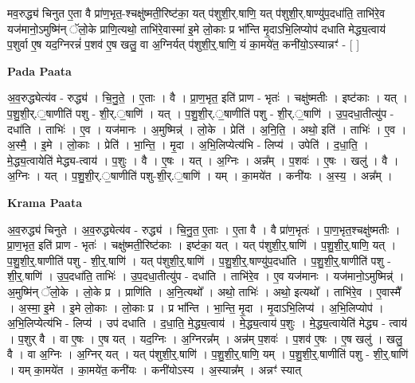 \documentclass[17pt]{extarticle}
\begin{document}
मव॒रुद्ध्य॑ चिनुत ए॒ता वै प्रा॑ण॒भृत॒-श्चक्षु॑ष्मती॒रिष्ट॑का॒ यत् प॑शुशी॒र्.षाणि॒ यत् प॑शुशी॒र्.षाण्यु॑प॒दधा॑ति॒ ताभि॑रे॒व यज॑मानो॒ऽमुष्मि॑न् ॅलो॒के प्राणि॒त्यथो॒ ताभि॑रे॒वास्मा॑ इ॒मे लो॒काः प्र भा᳚न्ति मृ॒दाऽभि॒लिप्योप॑ दधाति मेद्ध्य॒त्वाय॑ प॒शुर्वा ए॒ष यद॒ग्निरन्नं॑ प॒शव॑ ए॒ष खलु॒ वा अ॒ग्निर्यत् प॑शुशी॒र्॒.षाणि॒ यं का॒मये॑त॒ कनी॑यो॒ऽस्यान्नꣳ॑ - [  ] \newline

\textbf{Pada Paata} \newline

अ॒व॒रुद्ध्येत्य॑व - रुद्ध्य॑ । चि॒नु॒ते॒ । ए॒ताः । वै । प्रा॒ण॒भृत॒ इति॑ प्राण - भृतः॑ । चक्षु॑ष्मतीः । इष्ट॑काः । यत् । प॒शु॒शी॒र्.॒षाणीति॑ पशु - शी॒र्.॒षाणि॑ । यत् । प॒शु॒शी॒र्.॒षाणीति॑ पशु - शी॒र्.॒षाणि॑ । उ॒प॒दधा॒तीत्यु॑प - दधा॑ति । ताभिः॑ । ए॒व । यज॑मानः । अ॒मुष्मिन्न्॑ । लो॒के । प्रेति॑ । अ॒नि॒ति॒ । अथो॒ इति॑ । ताभिः॑ । ए॒व । अ॒स्मै॒ । इ॒मे । लो॒काः । प्रेति॑ । भा॒न्ति॒ । मृ॒दा । अ॒भि॒लिप्येत्य॑भि - लिप्य॑ । उपेति॑ । द॒धा॒ति॒ । मे॒द्ध्य॒त्वायेति॑ मेद्ध्य-त्वाय॑ । प॒शुः । वै । ए॒षः । यत् । अ॒ग्निः । अन्न᳚म् । प॒शवः॑ । ए॒षः । खलु॑ । वै । अ॒ग्निः । यत् । प॒शु॒शी॒र्.॒षाणीति॑ पशु-शी॒र्.॒षाणि॑ । यम् । का॒मये॑त । कनी॑यः । अ॒स्य॒ । अन्न᳚म् ।  \newline


\textbf{Krama Paata} \newline

अ॒व॒रुद्ध्य॑ चिनुते । अ॒व॒रुद्ध्येत्य॑व - रुद्ध्य॑ । चि॒नु॒त॒ ए॒ताः । ए॒ता वै । वै प्रा॑ण॒भृतः॑ । पा॒ण॒भृत॒श्चक्षु॑ष्मतीः । प्रा॒ण॒भृत॒ इति॑ प्राण - भृतः॑ । चक्षु॑ष्मती॒रिष्ट॑काः । इष्ट॑का॒ यत् । यत् प॑शुशी॒र्॒.षाणि॑ । प॒शु॒शी॒र्॒.षाणि॒ यत् । प॒शु॒शी॒र्॒.षाणीति॑ पशु - शी॒र्॒.षाणि॑ । यत् प॑शुशी॒र्॒.षाणि॑ । प॒शु॒शी॒र्॒.षाण्यु॑प॒दधा॑ति । प॒शु॒शी॒र्॒.षाणीति॑ पशु - शी॒र्॒.षाणि॑ । उ॒प॒दधा॑ति॒ ताभिः॑ । उ॒प॒दधा॒तीत्यु॑प - दधा॑ति । ताभि॑रे॒व । ए॒व यज॑मानः । यज॑मानो॒ऽमुष्मिन्न्॑ । अ॒मुष्मि॑न् ॅलो॒के । लो॒के प्र । प्राणि॑ति । अ॒नि॒त्यथो᳚ । अथो॒ ताभिः॑ । अथो॒ इत्यथो᳚ । ताभि॑रे॒व । ए॒वास्मै᳚ । अ॒स्मा॒ इ॒मे । इ॒मे लो॒काः । लो॒काः प्र । प्र भा᳚न्ति । भा॒न्ति॒ मृ॒दा । मृ॒दाऽभि॒लिप्य॑ । अ॒भि॒लिप्योप॑ । अ॒भि॒लिप्येत्य॑भि - लिप्य॑ । उप॑ दधाति । द॒धा॒ति॒ मे॒द्ध्य॒त्वाय॑ । मे॒द्ध्य॒त्वाय॑ प॒शुः । मे॒द्ध्य॒त्वायेति॑ मेद्ध्य - त्वाय॑ । प॒शुर् वै । वा ए॒षः । ए॒ष यत् । यद॒ग्निः । अ॒ग्निरन्न᳚म् । अन्न॑म् प॒शवः॑ । प॒शव॑ ए॒षः । ए॒ष खलु॑ । खलु॒ वै । वा अ॒ग्निः । अ॒ग्निर् यत् । यत् प॑शुशी॒र्॒.षाणि॑ । प॒शु॒शी॒र्॒.षाणि॒ यम् । प॒शु॒शी॒र्॒.षाणीति॑ पशु - शी॒र्॒.षाणि॑ । यम् का॒मये॑त । का॒मये॑त॒ कनी॑यः । कनी॑योऽस्य । अ॒स्यान्न᳚म् । अन्नꣳ॑ स्यात् \newline
\end{document}

